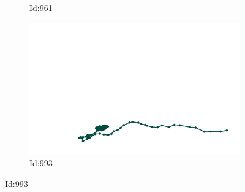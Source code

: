 \documentclass[12pt,twoside]{report}
\begin{document}
\begin{figure}
\begin{subfigure}[b]{0.20\textwidth}
\caption{Id:961}
\end{subfigure}
\begin{subfigure}[b]{0.20\textwidth}
\centering
\includegraphics[width=\textwidth]{../../trajectories/993.png}
\caption{Id:993}
\end{subfigure}
\end{figure}
\end{document}
